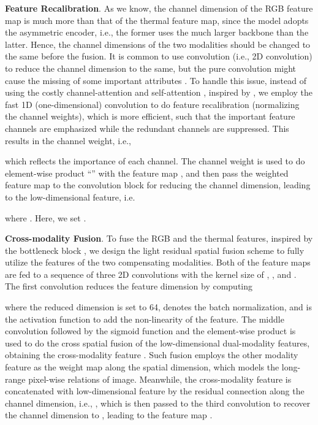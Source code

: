 \documentclass[10.5pt,twocolumn,journal,letterpaper]{IEEEtran}
\newcommand{\ie}{i.e.}
\begin{document}
\textbf{Feature Recalibration}. As we know, the channel dimension of the RGB feature map is much more than that of the thermal feature map, since the model adopts the asymmetric encoder, \ie, the former uses the much larger backbone than the latter. Hence, the channel dimensions of the two modalities should be changed to the same before the fusion. It is common to use  convolution (\ie, 2D convolution) to reduce the channel dimension to the same, but the pure  convolution might cause the missing of some important attributes \cite{huang-iccv2021-fapn}. To handle this issue, instead of using the costly channel-attention \cite{hu-cvpr2018-senet} and self-attention \cite{vaswani-nips2017-attention}, inspired by \cite{wang-cvpr2020-eca, huang-iccv2021-fapn}, we employ the fast 1D (one-dimensional) convolution  to do feature recalibration (normalizing the channel weights), which is more efficient, such that the important feature channels are emphasized while the redundant channels are suppressed. This results in the channel weight, \ie,

which reflects the importance of each channel. The channel weight is used to do element-wise product ``'' with the feature map , and then pass the weighted feature map to the  convolution block  for reducing the channel dimension, leading to the low-dimensional feature, \ie
	
where . Here, we set . 

\textbf{Cross-modality Fusion}. To fuse the RGB and the thermal features, inspired by the bottleneck block \cite{he-cvpr2016-resnet}, we design the light residual spatial fusion scheme to fully utilize the features of the two compensating modalities. Both of the feature maps are fed to a sequence of three 2D convolutions with the kernel size of , , and . The first convolution reduces the feature dimension by computing

where the reduced dimension  is set to 64,  denotes the batch normalization, and  is the activation function to add the non-linearity of the feature. The middle convolution followed by the sigmoid function  and the element-wise product  is used to do the cross spatial fusion of the low-dimensional dual-modality features, obtaining the cross-modality feature . Such fusion employs the other modality feature as the weight map along the spatial dimension, which models the long-range pixel-wise relations of image. Meanwhile, the cross-modality feature is concatenated with low-dimensional feature  by the residual connection along the channel dimension, \ie, , which is then passed to the third convolution to recover the channel dimension to , leading to the feature map .
\end{document}
